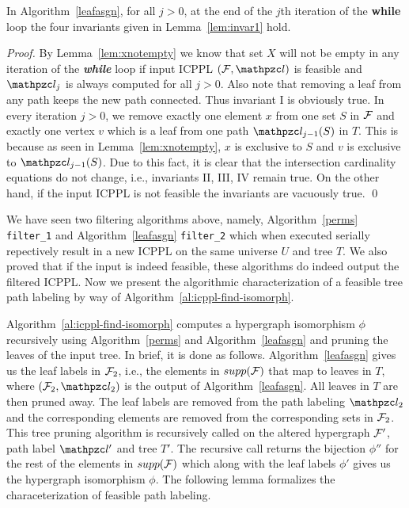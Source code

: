 \documentclass[MS]             %
              {iitmdiss_as}    %
\begin{document}
\begin{lemma}
  \label{lem:invar3}
  In Algorithm~\ref{leafasgn}, for all $j > 0$, at the end of the
  $j$th iteration of the {\bf while} loop the four invariants given in
  Lemma~\ref{lem:invar1} hold.
\end{lemma}
\begin{proof}
  By Lemma~\ref{lem:xnotempty} we know that set $X$ will not be empty
  in any iteration of the {\em \bf while} loop if input ICPPL $(\cF,
  \cl)$ is feasible and $\cl_j$ is always computed for all $j >
  0$. Also note that removing a leaf from any path keeps the new path
  connected. Thus invariant I is obviously true. In every iteration $j
  > 0$, we remove exactly one element $x$ from one set $S$ in ${\cal F}$
  and exactly one vertex $v$ which is a leaf from one path
  $\cl_{j-1}(S)$ in $T$. This is because as seen in
  Lemma~\ref{lem:xnotempty}, $x$ is exclusive to $S$ and $v$ is
  exclusive to $\cl_{j-1}(S)$. Due to this fact, it is clear that the
  intersection cardinality equations do not change, i.e., invariants
  II, III, IV remain true. On the other hand, if the input ICPPL is
  not feasible the invariants are vacuously true. \qed
\end{proof}



We have seen two filtering algorithms above, namely,
Algorithm~\ref{perms} {\tt filter\_1} and Algorithm~\ref{leafasgn}
{\tt filter\_2} which when executed serially repectively result in a
new ICPPL on the same universe $U$ and tree $T$. We also proved that
if the input is indeed feasible, these algorithms do indeed output the
filtered ICPPL. Now we present the algorithmic characterization of a
feasible tree path labeling by way of Algorithm~\ref{al:icppl-find-isomorph}.

Algorithm~\ref{al:icppl-find-isomorph} computes a
hypergraph isomorphism $\phi$ recursively using Algorithm~\ref{perms}
and Algorithm~\ref{leafasgn} and pruning the leaves of the input
tree. In brief, it is done as follows. Algorithm~\ref{leafasgn} gives
us the leaf labels in ${\cal F}_2$, i.e., the elements in $supp({\cal F})$ that
map to leaves in $T$, where $(\cF_2, \cl_2)$ is the output of
Algorithm~\ref{leafasgn}. All leaves in $T$ are then pruned away. The
leaf labels are removed from the path labeling $\cl_2$ and the
corresponding elements are removed from the corresponding sets in
${\cal F}_2$. This tree pruning algorithm is recursively called on the
altered hypergraph ${\cal F}'$, path label $\cl'$ and tree $T'$. The
recursive call returns the bijection $\phi''$ for the rest of the
elements in $supp({\cal F})$ which along with the leaf labels $\phi'$ gives
us the hypergraph isomorphism $\phi$.  The following lemma formalizes
the characeterization of feasible path labeling.
\end{document}
